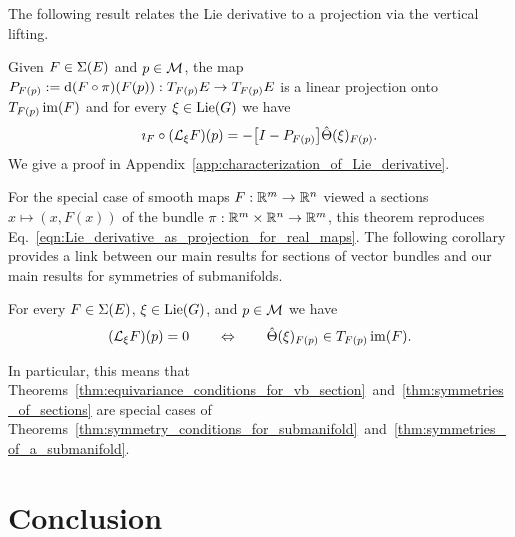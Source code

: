 \documentclass[twoside,11pt]{article}
\begin{document}
The following result relates the Lie derivative to a projection via the vertical lifting.
\begin{theorem}
    \label{thm:characterization_of_Lie_derivative}
    Given $F\in \operatorname{\Sigma}(E)$ and $p \in {\mathcal{M}}$,
    the map $P_{F(p)}:=\operatorname{\mathrm{d}}(F\circ \pi)(F(p)):T_{F(p)} E \to T_{F(p)} E$ is a linear projection onto $T_{F(p)}\operatorname{im}(F)$ and for every $\xi\in\operatorname{Lie}(G)$ we have
    \begin{equation}
        \imath_F \circ ({\mathcal{L}}_{\xi} F) (p) = 
        -\big[ I - P_{F(p)} \big] \hat{\Theta}(\xi)_{F(p)}.
        \label{eqn:Lie_derivative_as_projection}
    \end{equation}
    We give a proof in Appendix~\ref{app:characterization_of_Lie_derivative}.
\end{theorem}
For the special case of smooth maps $F:\mathbb{R}^m \to \mathbb{R}^n$ viewed a sections $x \mapsto (x,F(x))$ of the bundle $\pi:\mathbb{R}^m\times\mathbb{R}^n \to \mathbb{R}^m$, this theorem reproduces Eq.~\ref{eqn:Lie_derivative_as_projection_for_real_maps}.
The following corollary provides a link between our main results for sections of vector bundles and our main results for symmetries of submanifolds.
\begin{corollary}
\label{cor:properties_of_Lie_derivative}
For every $F\in\operatorname{\Sigma}(E)$, $\xi\in\operatorname{Lie}(G)$, and $p\in{\mathcal{M}}$ we have
\begin{equation}
    ({\mathcal{L}}_{\xi}F)(p) = 0 
    \qquad \Leftrightarrow \qquad 
    \hat{\Theta}(\xi)_{F(p)} \in T_{F(p)}\operatorname{im}(F).
\end{equation}
\end{corollary}
In particular, this means that 
Theorems~\ref{thm:equivariance_conditions_for_vb_section}~and~\ref{thm:symmetries_of_sections}
are special cases of
Theorems~\ref{thm:symmetry_conditions_for_submanifold}~and~\ref{thm:symmetries_of_a_submanifold}.

\section{Conclusion}
\label{sec:conclusion}
\end{document}
